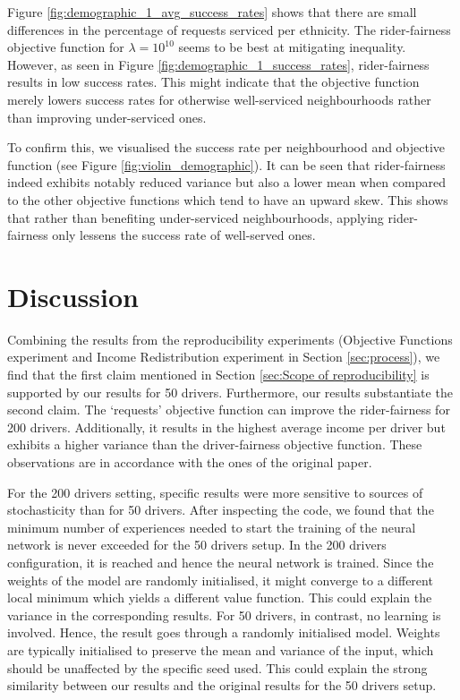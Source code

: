 Figure \ref{fig:demographic_1_avg_success_rates} shows that there are small differences in the percentage of requests serviced per ethnicity. The rider-fairness objective function for $\lambda=10^{10}$ seems to be best at mitigating inequality. However, as seen in Figure \ref{fig:demographic_1_success_rates}, rider-fairness results in low success rates. This might indicate that the objective function merely lowers success rates for otherwise well-serviced neighbourhoods rather than improving under-serviced ones.



To confirm this, we visualised the success rate per neighbourhood and objective function (see Figure \ref{fig:violin_demographic}). It can be seen that rider-fairness indeed exhibits notably reduced variance but also a lower mean when compared to the other objective functions which tend to have an upward skew. This shows that rather than benefiting under-serviced neighbourhoods, applying rider-fairness only lessens the success rate of well-served ones.

\section{Discussion}\label{sec:Discussion}
Combining the results from the reproducibility experiments (Objective Functions experiment and Income Redistribution experiment in Section \ref{sec:process}), we find that the first claim mentioned in Section \ref{sec:Scope of reproducibility} is supported by our results for 50 drivers. Furthermore, our results substantiate the second claim. The `requests' objective function can improve the rider-fairness for 200 drivers. Additionally, it results in the highest average income per driver but exhibits a higher variance than the driver-fairness objective function. These observations are in accordance with the ones of the original paper.



For the 200 drivers setting, specific results were more sensitive to sources of stochasticity than for 50 drivers. After inspecting the code, we found that the minimum number of experiences needed to start the training of the neural network is never exceeded for the 50 drivers setup. In the 200 drivers configuration, it is reached and hence the neural network is trained. Since the weights of the model are randomly initialised, it might converge to a different local minimum which yields a different value function. This could explain the variance in the corresponding results. For 50 drivers, in contrast, no learning is involved. Hence, the result goes through a randomly initialised model. Weights are typically initialised to preserve the mean and variance of the input, which should be unaffected by the specific seed used. This could explain the strong similarity between our results and the original results for the 50 drivers setup. 


